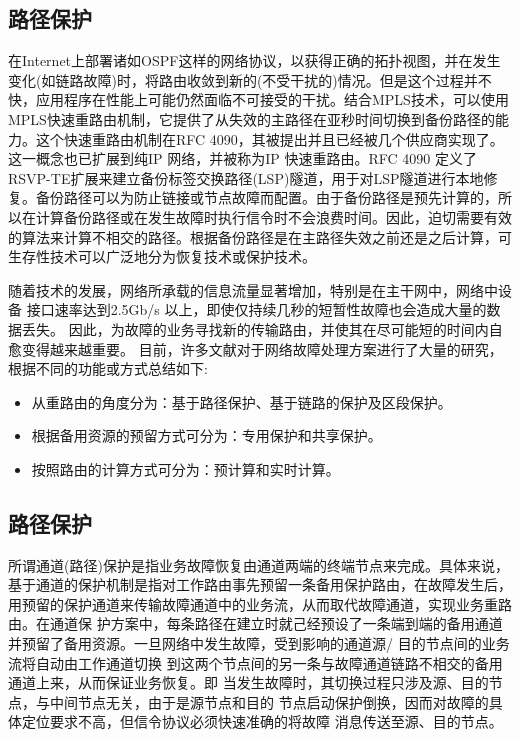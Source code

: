 \subsection{路径保护}
在Internet上部署诸如OSPF这样的网络协议，以获得正确的拓扑视图，并在发生变化(如链路故障)时，将路由收敛到新的(不受干扰的)情况。但是这个过程并不快，应用程序在性能上可能仍然面临不可接受的干扰。结合MPLS技术，可以使用MPLS快速重路由机制，它提供了从失效的主路径在亚秒时间切换到备份路径的能力。这个快速重路由机制在RFC 4090\cite{pan2005fast}，其被提出并且已经被几个供应商实现了。这一概念也已扩展到纯IP 网络，并被称为IP 快速重路由\cite{shand2010ip}。RFC 4090 定义了RSVP-TE扩展来建立备份标签交换路径(LSP)隧道，用于对LSP隧道进行本地修复。备份路径可以为防止链接或节点故障而配置。由于备份路径是预先计算的，所以在计算备份路径或在发生故障时执行信令时不会浪费时间。因此，迫切需要有效的算法来计算不相交的路径。根据备份路径是在主路径失效之前还是之后计算，可生存性技术可以广泛地分为恢复技术或保护技术。



随着技术的发展，网络所承载的信息流量显著增加，特别是在主干网中，网络中设备 接口速率达到2.5Gb/s 以上，即使仅持续几秒的短暂性故障也会造成大量的数据丢失。 因此，为故障的业务寻找新的传输路由，并使其在尽可能短的时间内自愈变得越来越重要。 目前，许多文献对于网络故障处理方案进行了大量的研究，根据不同的功能或方式总结如下:
\begin{itemize}
\item 从重路由的角度分为：基于路径保护、基于链路的保护及区段保护。
\item 根据备用资源的预留方式可分为：专用保护和共享保护。
\item 按照路由的计算方式可分为：预计算和实时计算。
\end{itemize}
\subsection{路径保护}
所谓通道(路径)保护是指业务故障恢复由通道两端的终端节点来完成。具体来说，基于通道的保护机制是指对工作路由事先预留一条备用保护路由，在故障发生后，用预留的保护通道来传输故障通道中的业务流，从而取代故障通道，实现业务重路由。在通道保 护方案中，每条路径在建立时就己经预设了一条端到端的备用通道并预留了备用资源。一旦网络中发生故障，受到影响的通道源/ 目的节点间的业务流将自动由工作通道切换 到这两个节点间的另一条与故障通道链路不相交的备用通道上来，从而保证业务恢复。即 当发生故障时，其切换过程只涉及源、目的节点，与中间节点无关，由于是源节点和目的 节点启动保护倒换，因而对故障的具体定位要求不高，但信令协议必须快速准确的将故障 消息传送至源、目的节点。

